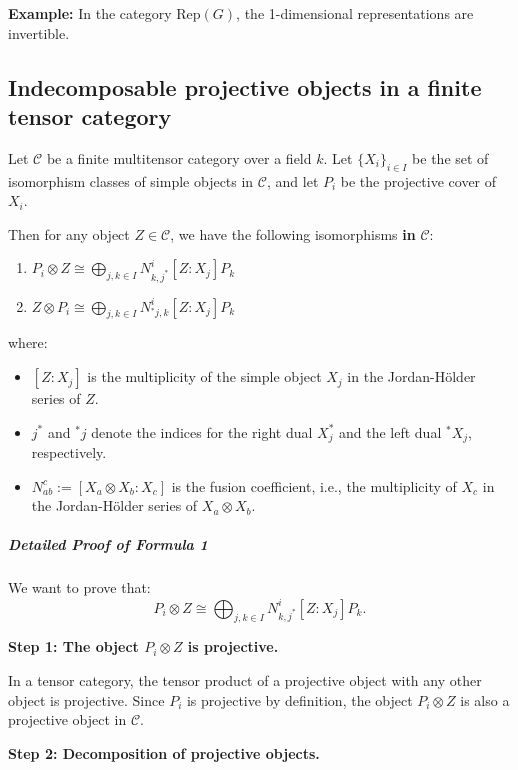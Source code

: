 \documentclass[11pt]{article}
\theoremstyle{definition}
\begin{document}
\textbf{Example:} In the category \( \mathrm{Rep}(G) \), the 1-dimensional representations are invertible.






\subsection{Indecomposable projective objects in a finite tensor category}
Let \( \mathcal{C} \) be a finite multitensor category over a field \( k \). Let \( \{X_i\}_{i \in I} \) be the set of isomorphism classes of simple objects in \( \mathcal{C} \), and let \( P_i \) be the projective cover of \( X_i \).

Then for any object \( Z \in \mathcal{C} \), we have the following isomorphisms \textbf{in} \( \mathcal{C} \):
\begin{enumerate}
    \item \( P_i \otimes Z \cong \bigoplus_{j,k \in I} N_{k,j^*}^i [Z:X_j] P_k \)
    \item \( Z \otimes P_i \cong \bigoplus_{j,k \in I} N_{{}^*j,k}^i [Z:X_j] P_k \)
\end{enumerate}

where:
\begin{itemize}
    \item \( [Z:X_j] \) is the multiplicity of the simple object \( X_j \) in the Jordan-H\"older series of \( Z \).
    \item \( j^* \) and \( {}^*j \) denote the indices for the right dual \( X_j^* \) and the left dual \( {}^*X_j \), respectively.
    \item \( N_{ab}^c := [X_a \otimes X_b : X_c] \) is the fusion coefficient, i.e., the multiplicity of \( X_c \) in the Jordan-H\"older series of \( X_a \otimes X_b \).
\end{itemize}

\subparagraph*{Detailed Proof of Formula 1}
We want to prove that:
\[
P_i \otimes Z \cong \bigoplus_{j,k \in I} N_{k,j^*}^i [Z:X_j] P_k.
\]

\textbf{Step 1: The object \( P_i \otimes Z \) is projective.}

In a tensor category, the tensor product of a projective object with any other object is projective. Since \( P_i \) is projective by definition, the object \( P_i \otimes Z \) is also a projective object in \( \mathcal{C} \).

\textbf{Step 2: Decomposition of projective objects.}
\end{document}

